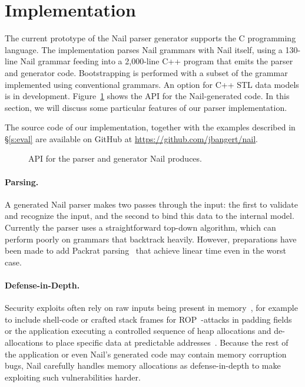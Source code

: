 \section{Implementation}
\label{s:impl}

The current prototype of the Nail parser generator supports the C programming
language. The implementation parses Nail grammars with Nail itself, using a
130-line Nail grammar feeding into a 2,000-line C++ program that
emits the parser and generator code. Bootstrapping is
performed with a subset of the grammar implemented using conventional grammars. 
An option for C++ STL data models is in development.
Figure~\ref{fig:dns-api} shows the API for the Nail-generated code.  In
this section, we will discuss some particular features of our parser
implementation.

The source code of our implementation, together with the examples described in
\S\ref{s:eval} are available on GitHub at \url{https://github.com/jbangert/nail}.


\begin{figure}[h]
\smaller[0.5]
% 
\caption{API for the parser and generator Nail produces.}
\label{fig:dns-api}
\end{figure}
\paragraph{Parsing.}

A generated Nail parser makes two passes through the input: the first to
validate and recognize the input, and the second to bind this data to the internal
model. Currently the parser uses a straightforward top-down algorithm, which can perform poorly on
grammars that backtrack heavily. However, preparations have been made to add Packrat
parsing~\cite{packrat-parsing:icfp02} that achieve linear time even in the worst case.

\paragraph{Defense-in-Depth.}

Security exploits often rely on raw inputs being present in memory~\cite{shotgun-parser}, for example to include
shell-code or crafted stack frames for ROP~\cite{phrack58:4-nergal}-attacks in padding fields or the
application executing a controlled sequence of heap allocations and de-allocations to place
specific data at predictable addresses~\cite{jp-advanced, vudo-malloc}. Because the rest of the
application or even Nail's generated code may contain memory corruption bugs, Nail
carefully handles memory allocations as defense-in-depth to make exploiting such vulnerabilities harder.

